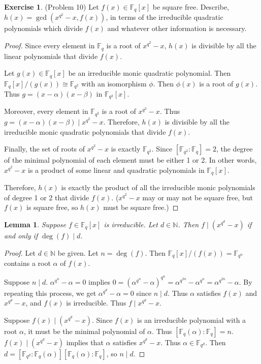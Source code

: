 \documentclass[12pt, psamsfonts]{amsart}
\newtheorem{lem}[thm]{Lemma}
\theoremstyle{definition}
\newtheorem*{exer}{Exercise}
\theoremstyle{remark}
\numberwithin{equation}{section}
\begin{document}
\begin{exer}{(Problem 10)}
  Let $f(x) \in \mathbb{F}_q[x]$ be square free.
  Describe, $h(x) = \gcd(x^{q^2} - x, f(x))$, in terms of the irreducible quadratic polynomials which divide $f(x)$ and whatever other information is necessary.
\end{exer}

\begin{proof}
  Since every element in $\mathbb{F}_q$ is a root of $x^{q^2} - x$, $h(x)$ is divisible by all the linear polynomials that divide $f(x)$.

  Let $g(x) \in \mathbb{F}_q[x]$ be an irreducible monic quadratic polynomial.
  Then $\mathbb{F}_q[x]/(g(x)) \cong \mathbb{F}_{q^2}$ with an isomorphism $\phi$.
  Then $\phi(x)$ is a root of $g(x)$.
  Thus $g = (x - \alpha)(x - \beta)$ in $\mathbb{F}_{q^2}[x]$.

  Moreover, every element in $\mathbb{F}_{q^2}$ is a root of $x^{q^2} - x$.
  Thus $g = (x - \alpha)(x - \beta) \mid x^{q^2} - x$.
  Therefore, $h(x)$ is divisible by all the irreducible monic quadratic polynomials that divide $f(x)$.

  Finally, the set of roots of $x^{q^2} - x$ is exactly $\mathbb{F}_{q^2}$.
  Since $[\mathbb{F}_{q^2}:\mathbb{F}_q] = 2$, the degree of the minimal polynomial of each element must be either 1 or 2.
  In other words, $x^{q^2} - x$ is a product of some linear and quadratic polynomials in $\mathbb{F}_q[x]$.

  Therefore, $h(x)$ is exactly the product of all the irreducible monic polynomials of degree 1 or 2 that divide $f(x)$.
  ($x^{q^2} - x$ may or may not be square free, but $f(x)$ is square free, so $h(x)$ must be square free.)
\end{proof}

\begin{lem}
  Suppose $f \in \mathbb{F}_q[x]$ is irreducible.
  Let $d \in \mathbb{N}$.
  Then $f \mid (x^{q^d} - x)$ if and only if $\deg(f) \mid d$.
\end{lem}

\begin{proof}
  Let $d \in \mathbb{N}$ be given.
  Let $n = \deg(f)$.
  Then $\mathbb{F}_q[x]/(f(x)) = \mathbb{F}_{q^n}$ contains a root $\alpha$ of $f(x)$.

  Suppose $n \mid d$.
  $\alpha^{q^n} - \alpha = 0$ implies $0 = (\alpha^{q^n} - \alpha)^{q^n} = \alpha^{q^{2n}} - \alpha^{q^n} = \alpha^{q^{2n}} - \alpha$.
  By repeating this process, we get $\alpha^{q^{d}} - \alpha = 0$ since $n \mid d$.
  Thus $\alpha$ satisfies $f(x)$ and $x^{q^d} - x$, and $f(x)$ is irreducible.
  Thus $f \mid x^{q^d} - x$.

  Suppose $f(x) \mid (x^{q^d} - x)$.
  Since $f(x)$ is an irreducible polynomial with a root $\alpha$, it must be the minimal polynomial of $\alpha$.
  Thus $[\mathbb{F}_q(\alpha):\mathbb{F}_q] = n$.
  $f(x) \mid (x^{q^d} - x)$ implies that $\alpha$ satisfies $x^{q^d} - x$.
  Thus $\alpha \in \mathbb{F}_{q^d}$.
  Then $d = [\mathbb{F}_{q^d}:\mathbb{F}_q(\alpha)][\mathbb{F}_q(\alpha):\mathbb{F}_q]$, so $n \mid d$.
\end{proof}
\end{document}
